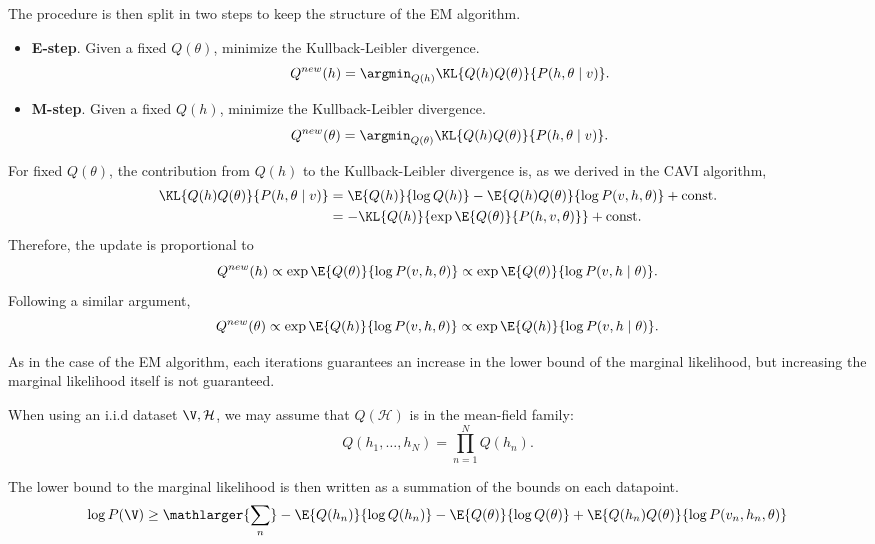The procedure is then split in two steps to keep the structure of the EM algorithm.

\begin{itemize}
  \item \textbf{E-step}. Given a fixed \(Q(\theta)\), minimize the Kullback-Leibler divergence.
    \[
    Q^{new}(h) = \argmin_{Q(h)}\KL{Q(h)Q(\theta)}{P(h,\theta \mid v)}.
    \]

  \item \textbf{M-step}. Given a fixed \(Q(h)\), minimize the Kullback-Leibler divergence.
    \[
    Q^{new}(\theta) = \argmin_{Q(\theta)}\KL{Q(h)Q(\theta)}{P(h,\theta \mid v)}.
    \]
\end{itemize}

For fixed \( Q(\theta) \), the contribution from \( Q(h) \) to the Kullback-Leibler divergence is, as we derived in the CAVI algorithm, 
\[
  \begin{aligned}
  \KL{Q(h)Q(\theta)}{P(h,\theta \mid v)} &= \E{Q(h)}{\log Q(h)} - \E{Q(h)Q(\theta)}{\log P(v,h,\theta)} + \text{const.} \\
  &= - \KL{Q(h)}{\exp \E{Q(\theta)}{P(h, v, \theta)}} + \text{const.}
  \end{aligned}
\]
Therefore, the update is proportional to 
\[
   Q^{new}(h) \propto \exp \E{Q(\theta)}{\log P(v,h,\theta)} \propto \exp \E{Q(\theta)}{\log P(v,h \mid \theta)}.
\]
Following a similar argument, 
\[
  Q^{new}(\theta) \propto \exp \E{Q(h)}{\log P(v,h,\theta)} \propto \exp \E{Q(h)}{\log P(v,h \mid \theta)}.
\]

As in the case of the EM algorithm, each iterations guarantees an increase in the lower bound of the marginal likelihood, but increasing the marginal likelihood itself is not guaranteed.

When using an i.i.d dataset \(\V, \mathcal{H}\), we may assume that \(Q(\mathcal{H})\) is in the mean-field family:
\[
  Q(h_{1}, \dots, h_{N}) = \prod_{n=1}^{N}Q(h_{n}).
\]

The lower bound to the marginal likelihood is then written as a summation of the bounds on each datapoint.
\[
  \log{P(\V)} \geq \mathlarger{\sum_{n}} -\E{Q(h_{n})}{\log{Q(h_{n})}}- \E{Q(\theta)}{\log{Q(\theta)}} + \E{Q(h_{n})Q(\theta)}{\log{P(v_{n}, h_{n},\theta)}}
\]
